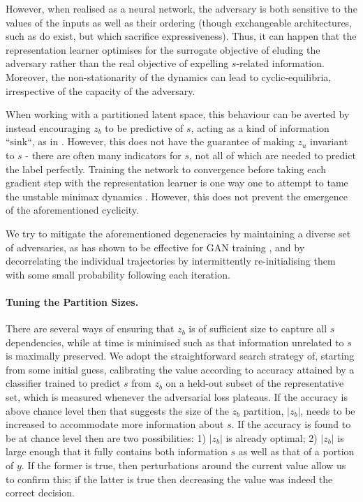 However, when realised as a neural network, the adversary is both sensitive to the values of the inputs as well as their ordering (though exchangeable architectures, such as \citet{zaheer2017deep} do exist, but which sacrifice expressiveness).
Thus, it can happen that the representation learner optimises for the surrogate objective of eluding the adversary rather than the real objective of expelling $s$-related information.
Moreover, the non-stationarity of the dynamics can lead to cyclic-equilibria, irrespective of the capacity of the adversary.

When working with a partitioned latent space, this behaviour can be averted by instead encouraging $z_b$ to be predictive of $s$, acting as a kind of information ``sink``, as in \citet{JacSmeOya18}.
However, this does not have the guarantee of making $z_u$ invariant to $s$ - there are often many indicators for $s$, not all of which are needed to predict the label perfectly.
Training the network to convergence before taking each gradient step with the representation learner is one way one to attempt to tame the unstable minimax dynamics \citep{feng2019learning}.
However, this does not prevent the emergence of the aforementioned cyclicity.

We try to mitigate the aforementioned degeneracies by maintaining a diverse set of adversaries, as has shown to be effective for GAN training \citep{durugkar2016generative}, and by decorrelating the individual trajectories by intermittently re-initialising them with some small probability following each iteration.

\paragraph{Tuning the Partition Sizes.}
There are several ways of ensuring that $z_b$ is of sufficient size to capture all $s$ dependencies, while at time is minimised such as that information unrelated to $s$ is maximally preserved. We adopt the straightforward search strategy of, starting from some initial guess, calibrating the value according to accuracy attained by a classifier trained to predict $s$ from $z_b$ on a held-out subset of the representative set, which is measured whenever the adversarial loss plateaus. If the accuracy is above chance level then that suggests the size of the $z_b$ partition, $|z_b|$, needs to be increased to accommodate more information about $s$. If the accuracy is found to be at chance level then are two possibilities: 1) $|z_b|$ is already optimal; 2) $|z_b|$ is large enough that it fully contains both information $s$ as well as that of a portion of $y$. If the former is true, then perturbations around the current value allow us to confirm this; if the latter is true then decreasing the value was indeed the correct decision.

